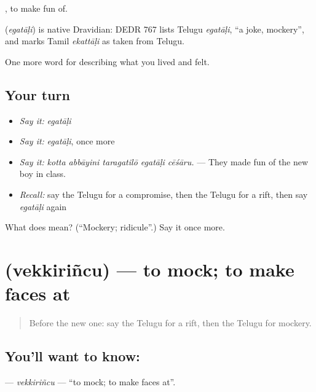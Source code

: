  , to make fun of.

\begin{cousinweb}
\textbf{} (\emph{egatāḷi}) is native Dravidian: DEDR 767 lists Telugu \emph{egatāḷi}, \textquotedblleft{}a joke, mockery\textquotedblright{}, and marks Tamil \emph{ekattāḷi} as taken from Telugu.
\end{cousinweb}

\begin{grammarlens}[title={What you've built}]
One more word for describing what you lived and felt.
\end{grammarlens}

\subsection*{Your turn}
\begin{itemize}
\raggedright
  \item \emph{Say it:} \emph{egatāḷi}
  \item \emph{Say it:} \emph{egatāḷi}, once more
  \item \emph{Say it:} \emph{kotta abbāyini taragatilō egatāḷi cēśāru.} — They made fun of the new boy in class.
  \item \emph{Recall:} say the Telugu for a compromise, then the Telugu for a rift, then say \emph{egatāḷi} again
\end{itemize}

\begin{tcolorbox}[breakable,colback=teal!4,colframe=teal!35!black,title={Before you move on}]
What does  mean? (\textquotedblleft{}Mockery; ridicule\textquotedblright{}.) Say it once more.
\end{tcolorbox}
\section[\texorpdfstring{\te{వెక్కిరించు} (vekkiriñcu)}{వెక్కిరించు (vekkiriñcu)}]{ (vekkiriñcu) — to mock; to make faces at}

\label{lesson:TE-C535-vekkirincu}



\begin{quote}
Before the new one: say the Telugu for a rift, then the Telugu for mockery.
\end{quote}

\subsection*{You'll want to know: }
\textbf{} — \emph{vekkiriñcu} — \textquotedblleft{}to mock; to make faces at\textquotedblright{}.

